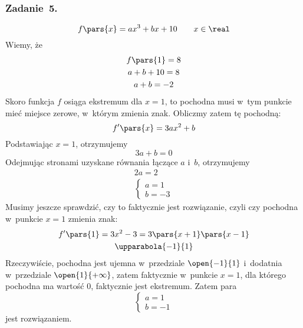 \subsubsection*{Zadanie~5.}
\begin{equation*}
    f\pars{x} = ax^3 + bx + 10 \qquad x \in \real
\end{equation*}
Wiemy, że
\begin{gather*}
    f\pars{1} = 8\\
    a + b + 10 = 8\\
    a + b = -2
\end{gather*}
Skoro funkcja \(f\) osiąga ekstremum dla \(x = 1\), to pochodna musi w~tym punkcie mieć miejsce zerowe, w~którym zmienia znak. Obliczmy zatem tę pochodną:
\begin{equation*}
    f'\pars{x}
        = 3ax^2 + b
\end{equation*}
Podstawiając \(x = 1\), otrzymujemy
\begin{equation*}
    3a + b = 0
\end{equation*}
Odejmując stronami uzyskane równania łączące \(a\) i~\(b\), otrzymujemy
\begin{gather*}
    2a = 2\\
    \begin{cases}
        a = 1\\
        b = -3
    \end{cases}
\end{gather*}
Musimy jeszcze sprawdzić, czy to faktycznie jest rozwiązanie, czyli czy pochodna w~punkcie \(x = 1\) zmienia znak:
\begin{gather*}
    f'\pars{1} = 3x^2 - 3
        = 3\pars{x + 1}\pars{x - 1}\\
    \upparabola{-1}{1}
\end{gather*}
Rzeczywiście, pochodna jest ujemna w~przedziale \(\open{-1}{1}\) i~dodatnia w~przedziale \(\open{1}{+\infty}\), zatem faktycznie w~punkcie \(x = 1\), dla którego pochodna ma wartość \(0\), faktycznie jest ekstremum. Zatem para
\begin{equation*}
    \begin{cases}
        a = 1\\
        b = -1
    \end{cases}
\end{equation*}
jest rozwiązaniem.
